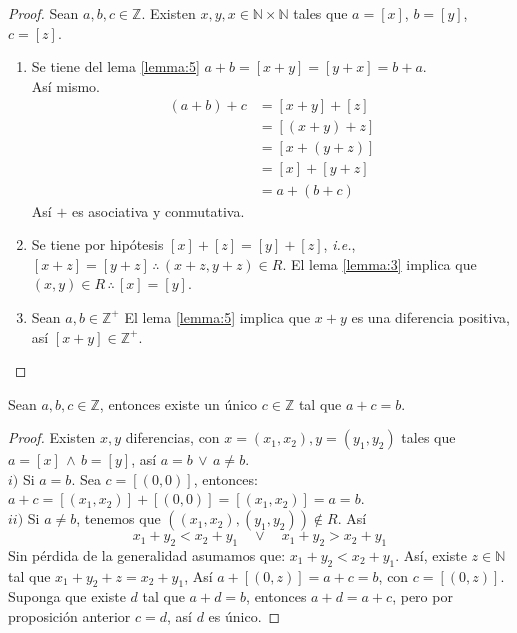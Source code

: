 \begin{proof}
  Sean $a,b,c \in \mathbb{Z}$. Existen $x, y, x \in \mathbb{N}
  \times \mathbb{N}$ tales que $a = [x]$, $b = [y]$, $ c = [z]$.
  \begin{enumerate}
    \item Se tiene del lema \ref{lemma:5} $a+b = [x +
      y] = [y + x] = b + a$.\\
      Así mismo. 
      \begin{align*}
        (a + b) + c &= [x+y] + [z] \\
                    &= [(x + y) + z] \\
                    &= [x + (y + z)] \\
                    &= [x] + [y + z] \\
                    &= a + (b + c)
      \end{align*}
      Así $+$ es asociativa y conmutativa.
    \item Se tiene por hipótesis $[x] + [z] = [y] + [z]$, \textit{i.e.}, $[x
      + z] = [y + z] \, \therefore \, (x+z,y+z) \in R$. El lema
      \ref{lemma:3} implica que $(x,y) \in R \, \therefore \, [x] = [y]$. 
    \item Sean $a, b \in \mathbb{Z}^+$ El lema \ref{lemma:5} implica que $x
      + y $ es una diferencia positiva, así $[x + y] \in \mathbb{Z}^+$.
  \end{enumerate}
\end{proof}
\begin{proposition}\label{prop:29}
  Sean $a,b,c \in \mathbb{Z}$, entonces existe un único $c \in
  \mathbb{Z}$ tal que $a + c = b$.
\end{proposition}
\begin{proof}
  Existen $x,y$ diferencias, con $x = (x_1, x_2), y = (y_1,y_2)$ tales que $a
  = [x] \, \land \, b = [y]$, así $a=b \, \lor \, a\neq b$.\\
  $i)$ Si $a = b$. Sea $c = [(0,0)]$, entonces:
  $a + c = [(x_1, x_2)] + [(0,0)] = [(x_1, x_2)] = a = b$. \\
  $ii)$ Si $a \neq b$, tenemos que $((x_1,x_2),(y_1,y_2)) \notin R$. Así 
  \[
    x_1 + y_2 < x_2 + y_1 \quad \lor \quad x_1 + y_2 > x_2 + y_1
  \]
  Sin pérdida de la generalidad asumamos que: $ x_1 + y_2 < x_2 + y_1 $. Así,
  existe $z \in \mathbb{N}$ tal que $x_1 + y_2 + z = x_2 + y_1$, Así $a +
  [(0,z)]= a +c  = b$, con $c = [(0,z)]$. Suponga que existe $d$ tal que $a +
  d = b$, entonces $a + d = a + c$, pero por proposición anterior $c =d$, así
  $d$ es único.
\end{proof}
